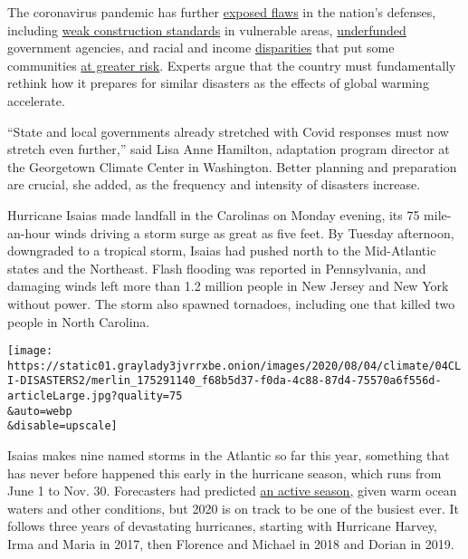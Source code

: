 The coronavirus pandemic has further
\href{https://www.nytimes3xbfgragh.onion/2020/05/22/climate/fema-volunteer-disaster-response.html}{exposed
flaws} in the nation's defenses, including
\href{https://www.nytimes3xbfgragh.onion/2019/10/26/climate/building-codes-secret-deal.html}{weak
construction standards} in vulnerable areas,
\href{https://newrepublic.com/article/158486/towns-arent-equipped-handle-climate-emergencies}{underfunded}
government agencies, and racial and income
\href{https://www.nytimes3xbfgragh.onion/2020/05/17/climate/pollution-poverty-coronavirus.html}{disparities}
that put some communities
\href{https://www.nytimes3xbfgragh.onion/2020/07/24/climate/houston-flooding-race.html}{at
greater risk}. Experts argue that the country must fundamentally rethink
how it prepares for similar disasters as the effects of global warming
accelerate.

``State and local governments already stretched with Covid responses
must now stretch even further,'' said Lisa Anne Hamilton, adaptation
program director at the Georgetown Climate Center in Washington. Better
planning and preparation are crucial, she added, as the frequency and
intensity of disasters increase.

Hurricane Isaias made landfall in the Carolinas on Monday evening, its
75 mile-an-hour winds driving a storm surge as great as five feet. By
Tuesday afternoon, downgraded to a tropical storm, Isaias had pushed
north to the Mid-Atlantic states and the Northeast. Flash flooding was
reported in Pennsylvania, and damaging winds left more than 1.2 million
people in New Jersey and New York without power. The storm also spawned
tornadoes, including one that killed two people in North Carolina.

\texttt{[image: https://static01.graylady3jvrrxbe.onion/images/2020/08/04/climate/04CLI-DISASTERS2/merlin\_175291140\_f68b5d37-f0da-4c88-87d4-75570a6f556d-articleLarge.jpg?quality=75\\\&auto=webp\\\&disable=upscale]}

Isaias makes nine named storms in the Atlantic so far this year,
something that has never before happened this early in the hurricane
season, which runs from June 1 to Nov. 30. Forecasters had predicted
\href{https://www.nytimes3xbfgragh.onion/2020/05/21/climate/hurricane-season-2020-noaa.html}{an
active season,} given warm ocean waters and other conditions, but 2020
is on track to be one of the busiest ever. It follows three years of
devastating hurricanes, starting with Hurricane Harvey, Irma and Maria
in 2017, then Florence and Michael in 2018 and Dorian in 2019.

